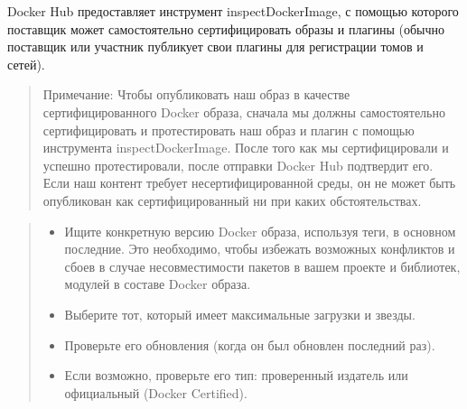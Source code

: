 \documentclass[letterpaper,10pt,russian]{sphinxmanual}
\begin{document}
\sphinxAtStartPar
Docker Hub предоставляет инструмент inspectDockerImage, с помощью которого поставщик может самостоятельно сертифицировать образы и плагины (обычно поставщик или участник публикует свои плагины для регистрации томов и сетей).
\begin{quote}

\sphinxAtStartPar
Примечание:
Чтобы опубликовать наш образ в качестве сертифицированного Docker образа, сначала мы должны самостоятельно сертифицировать и протестировать наш образ и плагин с помощью инструмента inspectDockerImage. После того как мы сертифицировали и успешно протестировали, после отправки Docker Hub подтвердит его. Если наш контент требует несертифицированной среды, он не может быть опубликован как сертифицированный ни при каких обстоятельствах.
\end{quote}
\begin{quote}

\sphinxAtStartPar
{}
\begin{itemize}
\item {} 
\sphinxAtStartPar
Ищите конкретную версию Docker образа, используя теги, в основном последние. Это необходимо, чтобы избежать возможных конфликтов и сбоев в случае несовместимости пакетов в вашем проекте и библиотек, модулей в составе Docker образа.

\item {} 
\sphinxAtStartPar
Выберите тот, который имеет максимальные загрузки и звезды.

\item {} 
\sphinxAtStartPar
Проверьте его обновления (когда он был обновлен последний раз).

\item {} 
\sphinxAtStartPar
Если возможно, проверьте его тип: проверенный издатель или официальный (Docker Certified).

\end{itemize}
\end{quote}



\renewcommand{\indexname}{Алфавитный указатель}
\printindex
\end{document}
